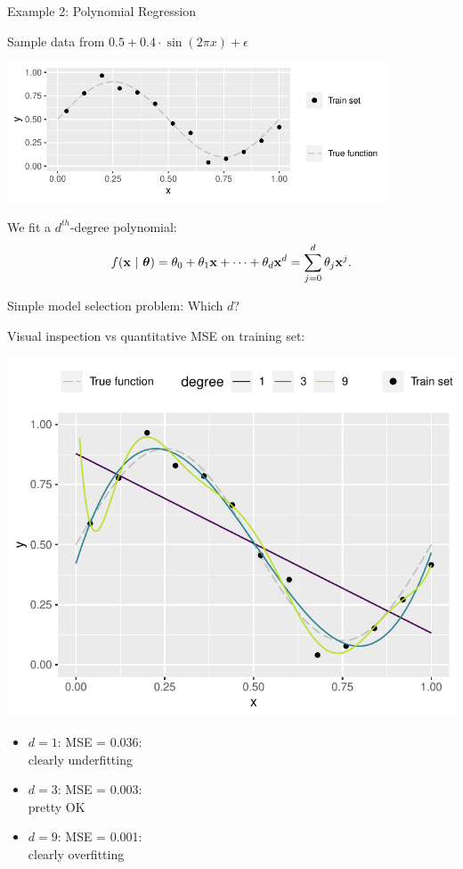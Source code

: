 \documentclass[11pt,compress,t,notes=noshow, xcolor=table]{beamer}
\begin{document}
\begin{vbframe}{Example 2: Polynomial Regression}

Sample data from
$0.5 + 0.4 \cdot \sin (2 \pi x) + \epsilon$

\vfill

\begin{center}
  \includegraphics[width=0.85\textwidth]{figure/eval_train_1}
\end{center}

We fit a $d^{th}$-degree polynomial:
\[ f(\mathbf{x} ~|~ \bm{\theta}) = \theta_0 + \theta_1 \mathbf{x} + \cdots + \theta_d \mathbf{x}^d = \sum_{j = 0}^{d}
\theta_j \mathbf{x}^j\text. \]

\framebreak

Simple model selection problem: Which $d$?

\vfill

Visual inspection vs quantitative MSE on training set:

\begin{minipage}[c]{0.6\textwidth}
  \includegraphics[width=\textwidth]{figure/eval_train_2} 
\end{minipage}%
\begin{minipage}[c]{0.4\textwidth}
  \begin{itemize}
    \footnotesize
    \item $d = 1$: MSE = 0.036: \\clearly underfitting
    \item $d = 3$: MSE = 0.003: \\pretty OK
    \item $d = 9$: MSE = 0.001: \\clearly overfitting
  \end{itemize}
\end{minipage}


\end{vbframe}
\end{document}
